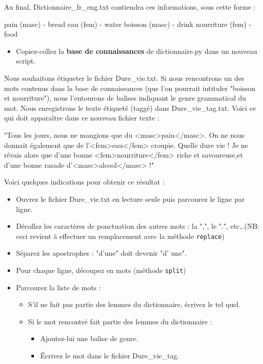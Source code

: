 Au final, Dictionnaire\_fr\_eng.txt contiendra ces informations, sous cette forme :
\begin{python}
pain (masc) - bread
eau (fem) - water
boisson (masc) - drink
nourriture (fem) - food
\end{python}

\exer

\begin{itemize}
 \item Copiez-collez la \textbf{base de connaissances} de dictionnaire.py dans un nouveau script.
\end{itemize}

Nous souhaitons étiqueter le fichier Dure\_vie.txt. Si nous rencontrons un des mots
contenus dans la base de connaissances (que l'on pourrait intituler "boisson et nourriture"), nous l'entourons de balises indiquant le genre grammatical du mot. Nous enregistrons le texte étiqueté (taggé) dans
Dure\_vie\_tag.txt. Voici ce qui doit apparaître dans ce nouveau fichier texte :

\begin{python}
"Tous les jours, nous ne mangions que du <masc>pain</masc>.
On ne nous donnait également que de l'<fem>eau</fem> croupie.
Quelle dure vie !
Je ne rêvais alors que d'une bonne <fem>nourriture</fem> 
riche et savoureuse,et d'une bonne rasade d'<masc>alcool</masc> !"
\end{python}

Voici quelques indications pour obtenir ce résultat :
\begin{itemize}
 \item Ouvrez le fichier Dure\_vie.txt en lecture seule puis parcourez le ligne par ligne.
 \item Décollez les caractères de ponctuation des autres mots : la ",", le ".", etc\dots (NB: ceci revient à effectuer un remplacement avec la méthode \texttt{replace})
 \item Séparez les apostrophes : "d'une" doit devenir "d' une".
 \item Pour chaque ligne, découpez en mots (méthode \texttt{split})%
 \item Parcourez la liste de mots :
\begin{itemize}
  \item S'il ne fait pas partie des lemmes du dictionnaire, écrivez le tel quel.
 \item Si le mot rencontré fait partie des lemmes du dictionnaire :
 \begin{itemize}
   \item Ajoutez-lui une balise de genre.
   \item Écrivez le mot dans le fichier Dure\_vie\_tag.
 \end{itemize}
 \end{itemize}
\end{itemize}
